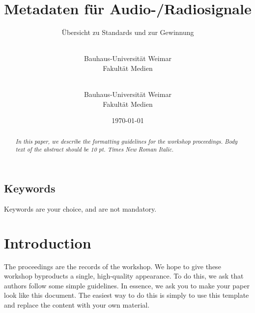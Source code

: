 

\usepackage[normalem]{ulem}

\title{Metadaten für Audio-/Radiosignale}
\subtitle{Übersicht zu Standards und zur Gewinnung}
\date{\today}
\author{
	\\
	Bauhaus-Universität Weimar\\
	Fakultät Medien\\
\and
	\\
	Bauhaus-Universität Weimar\\
	Fakultät Medien\\
}


\usepackage{graphicx}

	\maketitle
	
	\begin{abstract}
		\emph{In this paper, we describe the formatting guidelines
		for the workshop proceedings. Body text of the abstract
		should be 10 pt. Times New Roman Italic.}
	\end{abstract}
	
	\subsection{Keywords}
	Keywords are your choice, and are not mandatory.
	
	\section{Introduction}
	The proceedings are the records of the workshop. We hope to
	give these workshop byproducts a single, high-quality
	appearance. To do this, we ask that authors follow some simple
	guidelines. In essence, we ask you to make your paper look like
	this document. The easiest way to do this is simply to use this
	template and replace the content with your own material.
	
